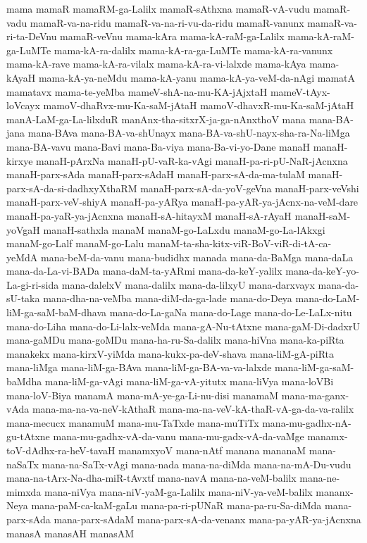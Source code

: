 {mama
mamaR
mamaRM-ga-Lalilx
mamaR-sAthxna
mamaR-vA-vudu
mamaR-vadu
mamaR-va-na-ridu
mamaR-va-na-ri-vu-da-ridu
mamaR-vanunx
mamaR-va-ri-ta-DeVnu
mamaR-veVnu
mama-kAra
mama-kA-raM-ga-Lalilx
mama-kA-raM-ga-LuMTe
mama-kA-ra-dalilx
mama-kA-ra-ga-LuMTe
mama-kA-ra-vanunx
mama-kA-rave
mama-kA-ra-vilalx
mama-kA-ra-vi-lalxde
mama-kAya
mama-kAyaH
mama-kA-ya-neMdu
mama-kA-yanu
mama-kA-ya-veM-da-nAgi
mamatA
mamatavx
mama-te-yeMba
mameV-shA-na-mu-KA-jAjxtaH
mameV-tAyx-loVcayx
mamoV-dhaRvx-mu-Ka-saM-jAtaH
mamoV-dhavxR-mu-Ka-saM-jAtaH
manA-LaM-ga-La-lilxduR
manAnx-tha-sitxrX-ja-ga-nAnxthoV
mana
mana-BA-jana
mana-BAva
mana-BA-va-shUnayx
mana-BA-va-shU-nayx-sha-ra-Na-liMga
mana-BA-vavu
mana-Bavi
mana-Ba-viya
mana-Ba-vi-yo-Dane
manaH
manaH-kirxye
manaH-pArxNa
manaH-pU-vaR-ka-vAgi
manaH-pa-ri-pU-NaR-jAcnxna
manaH-parx-sAda
manaH-parx-sAdaH
manaH-parx-sA-da-ma-tulaM
manaH-parx-sA-da-si-dadhxyXthaRM
manaH-parx-sA-da-yoV-geVna
manaH-parx-veVshi
manaH-parx-veV-shiyA
manaH-pa-yARya
manaH-pa-yAR-ya-jAcnx-na-veM-dare
manaH-pa-yaR-ya-jAcnxna
manaH-sA-hitayxM
manaH-sA-rAyaH
manaH-saM-yoVgaH
manaH-sathxla
manaM
manaM-go-LaLxdu
manaM-go-La-lAkxgi
manaM-go-Lalf
manaM-go-Lalu
manaM-ta-sha-kitx-viR-BoV-viR-di-tA-ca-yeMdA
mana-beM-da-vanu
mana-budidhx
manada
mana-da-BaMga
mana-daLa
mana-da-La-vi-BADa
mana-daM-ta-yARmi
mana-da-keY-yalilx
mana-da-keY-yo-La-gi-ri-sida
mana-dalelxV
mana-dalilx
mana-da-lilxyU
mana-darxvayx
mana-da-sU-taka
mana-dha-na-veMba
mana-diM-da-ga-lade
mana-do-Deya
mana-do-LaM-liM-ga-saM-baM-dhava
mana-do-La-gaNa
mana-do-Lage
mana-do-Le-LaLx-nitu
mana-do-Liha
mana-do-Li-lalx-veMda
mana-gA-Nu-tAtxne
mana-gaM-Di-dadxrU
mana-gaMDu
mana-goMDu
mana-ha-ru-Sa-dalilx
mana-hiVna
mana-ka-piRta
manakekx
mana-kirxV-yiMda
mana-kukx-pa-deV-shava
mana-liM-gA-piRta
mana-liMga
mana-liM-ga-BAva
mana-liM-ga-BA-va-va-lalxde
mana-liM-ga-saM-baMdha
mana-liM-ga-vAgi
mana-liM-ga-vA-yitutx
mana-liVya
mana-loVBi
mana-loV-Biya
manamA
mana-mA-ye-ga-Li-nu-disi
manamaM
mana-ma-ganx-vAda
mana-ma-na-va-neV-kAthaR
mana-ma-na-veV-kA-thaR-vA-ga-da-va-ralilx
mana-mecucx
manamuM
mana-mu-TaTxde
mana-muTiTx
mana-mu-gadhx-nA-gu-tAtxne
mana-mu-gadhx-vA-da-vanu
mana-mu-gadx-vA-da-vaMge
manamx-toV-dAdhx-ra-heV-tavaH
manamxyoV
mana-nAtf
manana
mananaM
mana-naSaTx
mana-na-SaTx-vAgi
mana-nada
mana-na-diMda
mana-na-mA-Du-vudu
mana-na-tArx-Na-dha-miR-tAvxtf
mana-navA
mana-na-veM-balilx
mana-ne-mimxda
mana-niVya
mana-niV-yaM-ga-Lalilx
mana-niV-ya-veM-balilx
mananx-Neya
mana-paM-ca-kaM-gaLu
mana-pa-ri-pUNaR
mana-pa-ru-Sa-diMda
mana-parx-sAda
mana-parx-sAdaM
mana-parx-sA-da-venanx
mana-pa-yAR-ya-jAcnxna
manasA
manasAH
manasAM
}
